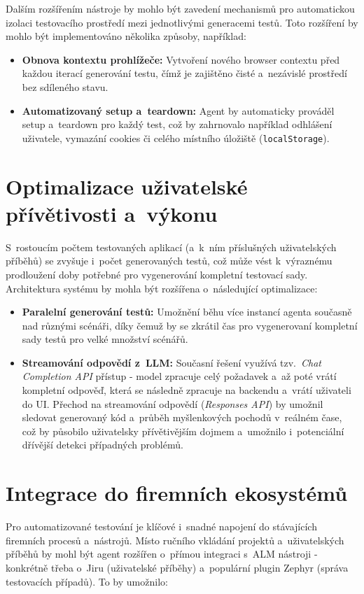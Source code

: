 \documentclass[czech, ing, kiv, he, iso690numb, viewonly]{fasthesis}
\begin{document}
Dalším rozšířením nástroje by mohlo být zavedení mechanismů pro automatickou izolaci testovacího prostředí
mezi jednotlivými generacemi testů. 
Toto rozšíření by mohlo být implementováno několika způsoby, například:

\begin{itemize}
    \item \textbf{Obnova kontextu prohlížeče:} Vytvoření nového browser 
    contextu před každou iterací generování testu, čímž je zajištěno čisté a~nezávislé prostředí bez sdíleného stavu.
    \item \textbf{Automatizovaný setup a~teardown:} Agent by automaticky prováděl setup a~teardown pro každý test, 
    což by zahrnovalo například odhlášení uživatele, vymazání cookies či celého místního úložiště (\texttt{localStorage}).
\end{itemize}

\section{Optimalizace uživatelské přívětivosti a~výkonu}
S~rostoucím počtem testovaných aplikací (a~k~ním příslušných uživatelských příběhů) 
se zvyšuje i~počet generovaných testů, což může vést k~výraznému prodloužení 
doby potřebné pro vygenerování kompletní testovací sady.
Architektura systému by mohla být rozšířena o~následující optimalizace:
\begin{itemize}
    \item \textbf{Paralelní generování testů:} Umožnění běhu více instancí agenta současně nad různými 
    scénáři, díky čemuž by se zkrátil čas pro vygenerovaní kompletní sady testů pro velké množství scénářů. 
    \item \textbf{Streamování odpovědí z~LLM:} Současní řešení využívá tzv.~\textit{Chat Completion API} přístup - 
    model zpracuje celý požadavek a~až poté vrátí kompletní odpověď, která se následně zpracuje na backendu a~vrátí uživateli do UI.
    Přechod na streamování odpovědí (\textit{Responses API}) by umožnil sledovat generovaný kód a~průběh myšlenkových pochodů v~reálném čase, což by působilo uživatelsky přívětivějším dojmem a~umožnilo i~potenciální dřívější detekci případných problémů. 
\end{itemize}

\section{Integrace do firemních ekosystémů}
Pro automatizované testování je klíčové i~snadné napojení do stávajících 
firemních procesů a~nástrojů. Místo ručního vkládání projektů a~uživatelských příběhů 
by mohl být agent rozšířen o~přímou integraci s~ALM nástroji - 
konkrétně třeba o~Jiru (uživatelské příběhy) a~populární plugin Zephyr (správa testovacích případů).
To by umožnilo:
\end{document}
